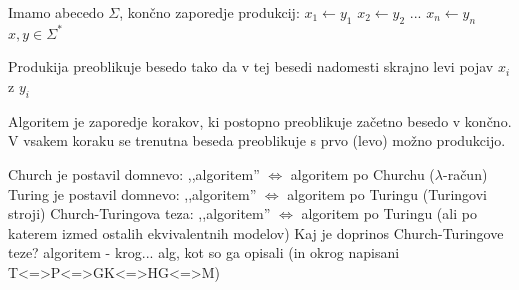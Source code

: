 \documentclass[10pt,a4paper,oneside]{book}
\begin{document}

Imamo abecedo $\Sigma$, končno zaporedje produkcij:
$x_1 \leftarrow y_1$
$x_2 \leftarrow y_2$
...
$x_n \leftarrow y_n$
$x,y \in \Sigma^*$%

Produkija preoblikuje besedo tako da v tej besedi nadomesti skrajno levi pojav $x_i$ z $y_i$ %

Algoritem je zaporedje korakov, ki postopno preoblikuje začetno besedo v končno. V vsakem koraku se trenutna beseda preoblikuje s prvo (levo) možno produkcijo.



Church je postavil domnevo: ,,algoritem'' {\bf$\Longleftrightarrow$} algoritem po Churchu ($\lambda$-račun)\\%
Turing je postavil domnevo: ,,algoritem''  {\bf$\Longleftrightarrow$} algoritem po Turingu (Turingovi stroji)
\br
Church-Turingova teza: ,,algoritem'' {\bf$\Longleftrightarrow$} algoritem po Turingu (ali po katerem izmed ostalih ekvivalentnih modelov)%
\br
Kaj je doprinos Church-Turingove teze?
algoritem%
\fixme - krog... alg, kot so ga opisali (in okrog napisani T<=>P<=>GK<=>HG<=>M)
\end{document}
